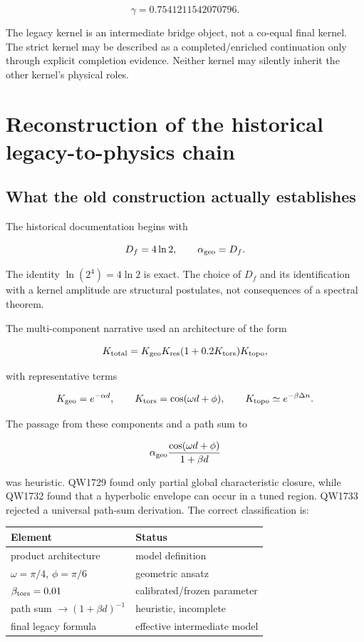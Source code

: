 \documentclass[11pt,a4paper,openany]{report}
\begin{document}
\[
\gamma=0.7541211542070796.
\]

The legacy kernel is an intermediate bridge object, not a co-equal final kernel. The strict kernel may be described as a completed/\allowbreak{}enriched continuation only through explicit completion evidence. Neither kernel may silently inherit the other kernel's physical roles.

\chapter{Reconstruction of the historical legacy-to-physics chain}

\section{What the old construction actually establishes}

The historical documentation begins with

\[
D_f=4\ln2,\qquad \alpha_{\rm geo}=D_f.
\]

The identity \(\ln(2^4)=4\ln2\) is exact. The choice of \(D_f\) and its identification with a kernel amplitude are structural postulates, not consequences of a spectral theorem.

The multi-component narrative used an architecture of the form

\[
K_{\rm total}
=
K_{\rm geo}K_{\rm res}(1+0.2K_{\rm tors})K_{\rm topo},
\]

with representative terms

\[
K_{\rm geo}=e^{-\alpha d},
\qquad
K_{\rm tors}=\cos(\omega d+\phi),
\qquad
K_{\rm topo}\simeq e^{-\beta\Delta n}.
\]

The passage from these components and a path sum to

\[
\alpha_{\rm geo}
\frac{\cos(\omega d+\phi)}{1+\beta d}
\]

was heuristic. QW1729 found only partial global characteristic closure, while QW1732 found that a hyperbolic envelope can occur in a tuned region. QW1733 rejected a universal path-sum derivation. The correct classification is:

\begin{center}
\begingroup\small
\setlength{\tabcolsep}{2.5pt}
\renewcommand{\arraystretch}{1.16}
\begin{longtable}{@{}p{}p{}@{}}
\toprule
\textbf{Element} & \textbf{Status} \\
\midrule
\endhead
product architecture & model definition \\
\(\omega=\pi/4\), \(\phi=\pi/6\) & geometric ansatz \\
\(\beta_{\rm tors}=0.01\) & calibrated/\allowbreak{}frozen parameter \\
path sum \(\to(1+\beta d)^{-1}\) & heuristic, incomplete \\
final legacy formula & effective intermediate model \\
\bottomrule
\end{longtable}
\endgroup
\end{center}
\end{document}
